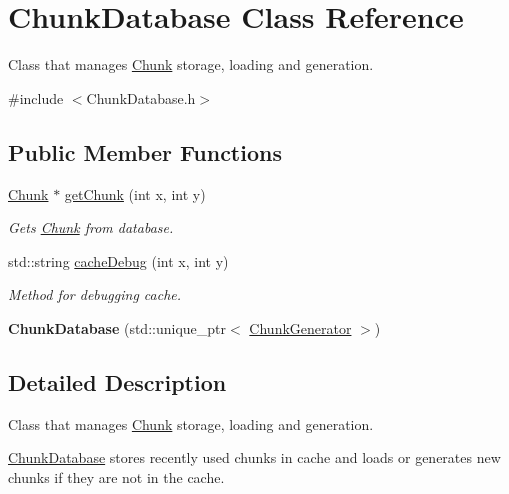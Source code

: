 \hypertarget{classChunkDatabase}{\section{Chunk\-Database Class Reference}
\label{classChunkDatabase}
}


Class that manages \hyperlink{classChunk}{Chunk} storage, loading and generation.  




{\ttfamily \#include $<$Chunk\-Database.\-h$>$}

\subsection*{Public Member Functions}
\begin{DoxyCompactItemize}
\item 
\hyperlink{classChunk}{Chunk} $\ast$ \hyperlink{classChunkDatabase_abcf683d90bbfc79651f0ccc377037c64}{get\-Chunk} (int x, int y)
\begin{DoxyCompactList}\small\item\em Gets \hyperlink{classChunk}{Chunk} from database. \end{DoxyCompactList}\item 
std\-::string \hyperlink{classChunkDatabase_a859a5a44d31f8fa40fe8d7936b27b5f5}{cache\-Debug} (int x, int y)
\begin{DoxyCompactList}\small\item\em Method for debugging cache. \end{DoxyCompactList}\item 
\hypertarget{classChunkDatabase_ac679a24342adcd98d02c3318882651e4}{{\bfseries Chunk\-Database} (std\-::unique\-\_\-ptr$<$ \hyperlink{classChunkGenerator}{Chunk\-Generator} $>$)}\label{classChunkDatabase_ac679a24342adcd98d02c3318882651e4}

\end{DoxyCompactItemize}


\subsection{Detailed Description}
Class that manages \hyperlink{classChunk}{Chunk} storage, loading and generation. 

\hyperlink{classChunkDatabase}{Chunk\-Database} stores recently used chunks in cache and loads or generates new chunks if they are not in the cache. 

